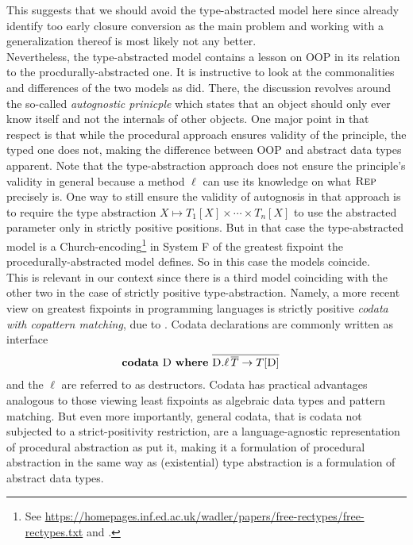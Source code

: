This suggests that we should avoid the type-abstracted model here since \citet{7e4a991f} already identify too early closure conversion as the main problem and working with a generalization thereof is most likely not any better.
\\
Nevertheless, the type-abstracted model contains a lesson on OOP in its relation to the procdurally-abstracted one.
It is instructive to look at the commonalities and differences of the two models as \citet{cook09understanding} did.
There, the discussion revolves around the so-called \emph{autognostic prinicple} which states that an object should only ever know itself and not the internals of other objects.
One major point in that respect is that while the procedural approach ensures validity of the principle, the typed one does not, making the difference between OOP and abstract data types apparent.
Note that the type-abstraction approach does not ensure the principle's validity in general because a method $\ell$ can use its knowledge on what $\textsc{Rep}$ precisely is.
One way to still ensure the validity of autognosis in that approach is to require the type abstraction $X \mapsto T_{1}[X] \times \cdots \times T_{n}[X]$ to use the abstracted parameter only in strictly positive positions.
But in that case the type-abstracted model is a Church-encoding\footnote{See \href{https://homepages.inf.ed.ac.uk/wadler/papers/free-rectypes/free-rectypes.txt}{https://homepages.inf.ed.ac.uk/wadler/papers/free-rectypes/free-rectypes.txt} and \cite{387458b4}.} in System F of the greatest fixpoint the procedurally-abstracted model defines.
So in this case the models coincide.
\\
This is relevant in our context since there is a third model coinciding with the other two in the case of strictly positive type-abstraction.
Namely, a more recent view on greatest fixpoints in programming languages is strictly positive \emph{codata with copattern matching}, due to \cite{abel13copatterns}. Codata declarations are commonly written as interface
\begin{align*}
  &
  \mathbf{codata}\
  \textsc{D}\
  \mathbf{where}\
  \overline{\textsc{D}.\ell\,\overline{T} \to T[\textsc{D}]}
\end{align*}
and the $\ell$ are referred to as destructors.
Codata has practical advantages analogous to those viewing least fixpoints as algebraic data types and pattern matching.
But even more importantly, general codata, that is codata not subjected to a strict-positivity restriction, are a {\glqq}language-agnostic representation of procedural abstraction{\grqq} as \citet{downen2019codata} put it, making it a formulation of procedural abstraction in the same way as (existential) type abstraction is a formulation of abstract data types.
